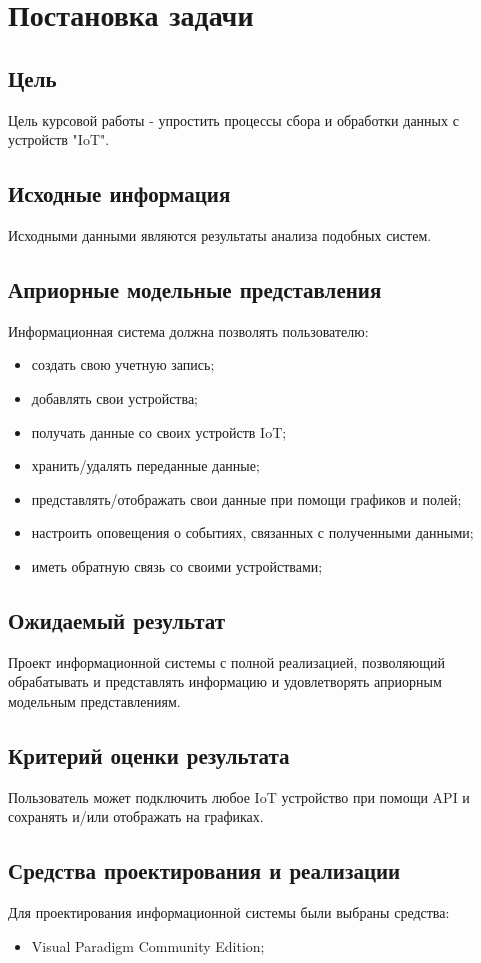 \documentclass[12pt]{article}
\begin{document}
    \section{Постановка задачи}
    \subsection{Цель}
    Цель курсовой работы - упростить процессы сбора и обработки данных с устройств "IoT".
    \subsection{Исходные информация}
    Исходными данными являются результаты анализа подобных систем.
    \subsection{Априорные модельные представления}
    Информационная система должна позволять пользователю:
    \begin{itemize}
        \item создать свою учетную запись;
        \item добавлять свои устройства;
        \item получать данные со своих устройств IoT;
        \item хранить/удалять переданные данные;
        \item представлять/отображать свои данные при помощи графиков и полей;
        \item настроить оповещения о событиях, связанных с полученными данными;
        \item иметь обратную связь со своими устройствами;
    \end{itemize}
    \subsection{Ожидаемый результат}
    Проект информационной системы с полной реализацией, позволяющий обрабатывать и представлять информацию
    и удовлетворять априорным модельным представлениям.
    \subsection{Критерий оценки результата}
    Пользователь может подключить любое IoT устройство при помощи API и сохранять и/или отображать на графиках.
    \subsection{Средства проектирования и реализации}
    Для проектирования информационной системы были выбраны средства:
    \begin{itemize}
        \item Visual Paradigm Community Edition;
    \end{itemize}
\end{document}
